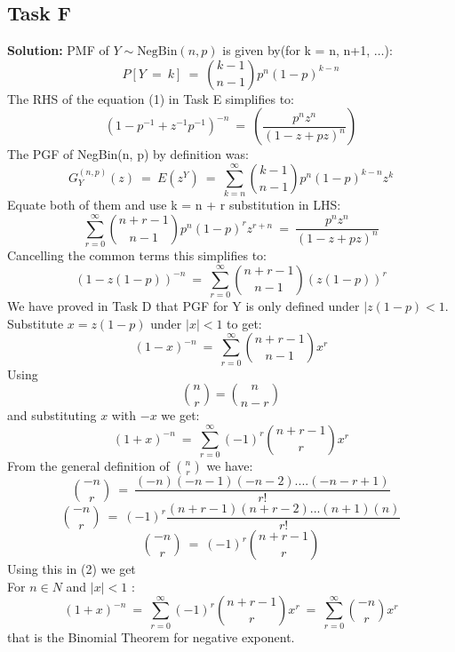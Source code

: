 \documentclass[12pt]{article}
\begin{document}
\subsection{Task F}
\textbf{Solution: } \newline
PMF of $Y \sim \text{NegBin}(n, p)$ is given by(for k = n, n+1, $\dots$):
\begin{equation}
    P[Y\ =\ k]\ =\ \binom{k-1}{n-1}p^n(1-p)^{k-n}
\end{equation}
The RHS of the equation (1) in Task E simplifies to:
\[(1-p^{-1}+z^{-1}p^{-1})^{-n}\ =\ \left(\frac{p^{n}z^{n}}{(1-z+pz)^n}\right)\]
The PGF of NegBin(n, p) by definition was:
\[G_Y^{(n,p)}(z)\ =\ E(z^Y)\ =\ \sum_{k=n}^{\infty}\binom{k-1}{n-1}p^n(1-p)^{k-n}z^k\]
Equate both of them and use k = n + r substitution in LHS:
\[\sum_{r=0}^{\infty}\binom{n+r-1}{n-1}p^n(1-p)^{r}z^{r+n}\ =\ \frac{p^{n}z^{n}}{(1-z+pz)^n}\]
Cancelling the common terms this simplifies to:
\[(1-z(1-p))^{-n}\ =\ \sum_{r=0}^{\infty}\binom{n+r-1}{n-1}(z(1-p))^{r}\]
We have proved in Task D that PGF for Y is only defined under $|z(1-p)<1$. \\
Substitute $x = z(1-p)$ under $|x|<1$ to get:
\[(1-x)^{-n}\ =\ \sum_{r=0}^{\infty}\binom{n+r-1}{n-1}x^r \]
Using \[\binom{n}{r} = \binom{n}{n-r}\] and substituting $x$ with $-x$ we get:
\begin{equation}
    (1+x)^{-n}\ =\ \sum_{r=0}^{\infty}(-1)^{r}\binom{n+r-1}{r}x^r
\end{equation}
From the general definition of $\binom{n}{r}$ we have:
\[\binom{-n}{r}\ =\ \frac{(-n)(-n-1)(-n-2)....(-n-r+1)}{r!}\]
\[\binom{-n}{r}\ =\ (-1)^{r}\frac{(n+r-1)(n+r-2)...(n+1)(n)}{r!}\]
\[\binom{-n}{r}\ =\ (-1)^{r}\binom{n+r-1}{r}\]
Using this in (2) we get \\
For $n\in N$ and $|x|<1$ :
\begin{equation}
    (1+x)^{-n}\ =\ \sum_{r=0}^{\infty}(-1)^{r}\binom{n+r-1}{r}x^r\ =\ \sum_{r=0}^{\infty}\binom{-n}{r}x^r
\end{equation}
that is the Binomial Theorem for negative exponent.
\end{document}
